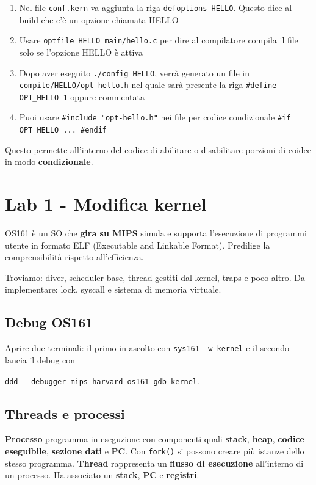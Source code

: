 \begin{enumerate}
  \item Nel file \verb|conf.kern| va aggiunta la riga \verb|defoptions HELLO|. Questo dice al build che c'è un opzione chiamata HELLO
  \item Usare \verb|optfile HELLO main/hello.c| per dire al compilatore  compila il file solo se l'opzione HELLO è attiva
  \item Dopo aver eseguito \verb|./config HELLO|, verrà generato un file in \verb|compile/HELLO/opt-hello.h| nel quale sarà presente la riga
        \verb|#define OPT_HELLO 1| oppure commentata
  \item Puoi usare \verb|#include "opt-hello.h"| nei file per codice condizionale \verb|#if OPT_HELLO ... #endif|
\end{enumerate}

Questo permette all'interno del codice di abilitare o disabilitare porzioni di coidce in modo \textbf{condizionale}.

\section{Lab 1 - Modifica kernel}

OS161 è un SO che \textbf{gira su MIPS} simula e supporta l'esecuzione di programmi utente in formato ELF (Executable and Linkable Format).
Predilige la comprensibilità rispetto all'efficienza.

Troviamo: diver, scheduler base, thread gestiti dal kernel, traps e poco altro.
Da implementare: lock, syscall e sistema di memoria virtuale.

\subsection{Debug OS161}
Aprire due terminali: il primo in ascolto con \verb|sys161 -w kernel| e il secondo lancia
il debug con


\verb|ddd --debugger mips-harvard-os161-gdb kernel|.

\subsection{Threads e processi}

\textbf{Processo} programma in eseguzione con componenti quali \textbf{stack}, \textbf{heap}, \textbf{codice eseguibile}, \textbf{sezione dati} e \textbf{PC}.
Con \verb|fork()| si possono creare più istanze dello stesso programma.
\textbf{Thread} rappresenta un \textbf{flusso di esecuzione} all'interno di un processo. Ha associato un \textbf{stack}, \textbf{PC} e \textbf{registri}.



